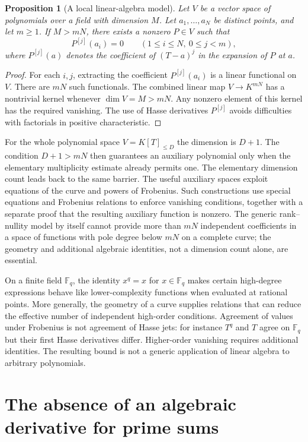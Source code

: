 \documentclass[11pt,openany,oneside]{scrbook}
\newtheorem{proposition}[theorem]{Proposition}
\theoremstyle{definition}
\theoremstyle{remark}
\newcommand{\F}{\mathbb F}
\begin{document}
\begin{proposition}[A local linear-algebra model]\label{prop:jet}
Let $V$ be a vector space of polynomials over a field with dimension $M$. Let $a_1,\ldots,a_N$ be distinct points, and let $m\ge1$. If $M>mN$, there exists a nonzero $P\in V$ such that
\[
P^{[j]}(a_i)=0\qquad(1\le i\le N,\ 0\le j<m),
\]
where $P^{[j]}(a)$ denotes the coefficient of $(T-a)^j$ in the expansion of $P$ at $a$.
\end{proposition}
\begin{proof}
For each $i,j$, extracting the coefficient $P^{[j]}(a_i)$ is a linear functional on $V$. There are $mN$ such functionals. The combined linear map $V\to K^{mN}$ has a nontrivial kernel whenever $\dim V=M>mN$. Any nonzero element of this kernel has the required vanishing. The use of Hasse derivatives $P^{[j]}$ avoids difficulties with factorials in positive characteristic.
\end{proof}

For the whole polynomial space $V=K[T]_{\le D}$ the dimension is $D+1$. The condition $D+1>mN$ then guarantees an auxiliary polynomial only when the elementary multiplicity estimate already permits one. The elementary dimension count leads back to the same barrier. The useful auxiliary spaces exploit equations of the curve and powers of Frobenius. Such constructions use special equations and Frobenius relations to enforce vanishing conditions, together with a separate proof that the resulting auxiliary function is nonzero. The generic rank--nullity model by itself cannot provide more than $mN$ independent coefficients in a space of functions with pole degree below $mN$ on a complete curve; the geometry and additional algebraic identities, not a dimension count alone, are essential.

On a finite field $\F_q$, the identity $x^q=x$ for $x\in\F_q$ makes certain high-degree expressions behave like lower-complexity functions when evaluated at rational points. More generally, the geometry of a curve supplies relations that can reduce the effective number of independent high-order conditions. Agreement of values under Frobenius is not agreement of Hasse jets: for instance $T^q$ and $T$ agree on $\F_q$ but their first Hasse derivatives differ.  Higher-order vanishing requires additional identities. The resulting bound is not a generic application of linear algebra to arbitrary polynomials.

\section{The absence of an algebraic derivative for prime sums}
\end{document}
